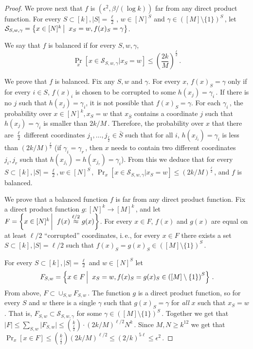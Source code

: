 \documentclass[11pt]{article}
\numberwithin{equation}{section}
\theoremstyle{definition}
\theoremstyle{plain}
\newcommand{\ie}{i.\,e.}
\newcommand{\Paren}[1]{\left(#1\right)} %
\newcommand{\abs}[1]{\lvert#1\rvert} %
\newcommand\sett[2]{\left\{ #1 \left| \; \vphantom{#1 #2} \right. #2  \right\}} %
\newcommand{\set}[1]{\{#1\}} %
\newcommand\f{f} %
\newcommand{\g}{g} %
\newcommand\neql[1]{\stackrel{{#1}}{ \approx}} %
\begin{document}
\begin{proof}
    We prove next that $\f$ is 
    $(\epsilon^2,{\beta}/{(\log k)})$ %
     far from any direct product function. For every $S\subset[k],\abs{S}=\frac{\ell}{2}$\,, $w\in[N]^S$ and $\gamma\in \Paren{[M]\setminus\set{1}}^S$\,, let $\mathcal{S}_{S,w,\gamma} = \sett{x\in[N]^k}{x_S=w,\f(x)_S=\gamma}$.
    
    We say that $\f$ is balanced if for every $S,w,\gamma$,
    \[ \Pr_x[x\in \mathcal{S}_{S,w,\gamma} | x_S=w]\leq \Paren{\frac{2k}{M}}^{\frac{\ell}{2}}\,.\]%
    
    We prove that $\f$ is balanced. Fix any $S,w$ and $\gamma$. For every $x$, $\f(x)_S = \gamma$ only if for every $i\in S$, $\f(x)_i$ is chosen to be corrupted to some $h(x_j) = \gamma_i$\,. If there is no $j$ such that $h(x_j)=\gamma_i$, %
it is  %
not possible that $\f(x)_S = \gamma$.
    For each $\gamma_i$\,, the probability over $x\in [N]^k, x_S=w$ that $x_{\bar{S}}$ contains a coordinate $j$ such that $h(x_j) = \gamma_i$ is smaller than 
  $2k/M$\,. %
 Therefore, the probability over $x$ that there are $\frac{\ell}{2}$ different coordinates $j_1,\ldots, j_{\frac{\ell}{2}}\in\bar{S}$ such that for all $i$, $h(x_{j_i}) = \gamma_i$ is less than 
    $\Paren{2k/M}^{\frac{\ell}{2}}$ %
     (if $\gamma_i = \gamma_r$\,, then $x$ needs to contain two different coordinates $j_i,j_r$ such that $h(x_{j_i} )=h(x_{j_r} ) = \gamma_i $). From this we deduce that for every $S\subset[k],\abs{S} = \frac{\ell}{2}, w\in[N]^S$\,,  $\Pr_{x}[x\in \mathcal{S}_{S,w,\gamma}|x_S = w]\leq 
 \Paren{2k/M}^{\frac{\ell}{2}}$\,, %
 and $\f$ is balanced.
    
    We prove that a balanced function $\f$ is far from any direct product function. Fix a direct product function $\g:[N]^k\rightarrow[M]^k$\,, and let $F = \sett{x\in[N]^k}{\f(x)\neql{
   \ell/2 %
}\g(x)}$. For every $x\in F$, $\f(x)$ and $\g(x)$ are equal on at least 
%
$\ell/2$ %
 ``corrupted'' coordinates, \ie, for every $x\in F$ there exists a set $S\subset[k],\abs{S} = 
 \ell/2$ %
  such that $\f(x)_S = \g(x)_S\in \Paren{[M]\setminus \{1\}}^S$\,.
    
    For every $S\subset[k],\abs{S} = \frac{\ell}{2}$ and $w\in[N]^S$ let 
    \[F_{S,w} = \sett{x\in F}{x_S = w, \f(x)_S = \g(x)_S\in \Paren{[M]\setminus \{1\}}^S}\,.\]%
    From above, $F\subset \cup_{S,w}F_{S,w}$\,. The function $\g$ is a direct product function, so for every $S$ and $w$ there is a single $\gamma$ such that $\g(x)_S=\gamma$ for \emph{all} $x$ such that $x_S=w$. That is, $F_{S,w}\subset \mathcal{S}_{S,w,\gamma}$ for some $\gamma\in\Paren{[M]\setminus \{1\}}^S$\,. Together we get that $\abs{F}\leq \sum_{S,w}\abs{F_{S,w}}\leq\binom{k}{\frac{\ell}{2}} \cdot
    \Paren{{2k}/{M}}^{{\ell}/{2}} %
     N^k$\,.
    Since $M,N\geq k^{12}$ we get that $\Pr_x[x\in F]\leq \binom{k}{\frac{\ell}{2}}
    \Paren{{2k}/{M}}^{{\ell}/{2}}\leq \Paren{2/k}^{5 \ell}\leq \epsilon^2$\,.
\end{proof}
\end{document}
